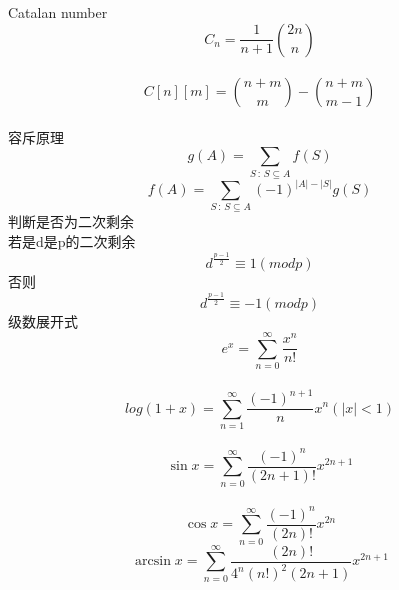 Catalan number\\
\[C_n = \frac{1}{n+1}{2n \choose n} \] \\
\[C[n][m] = {n+m \choose m} - {n+m \choose m-1} \]\\
容斥原理\\
\[g(A)=\sum_{S\,:\,S\subseteq A}f(S)\]
\[f(A)=\sum_{S\,:\,S\subseteq A}(-1)^{\left|A\right|-\left|S\right|}g(S)\]
判断是否为二次剩余\\
若是d是p的二次剩余
	\[ d^{\frac{p-1}{2}} \equiv 1 (mod p) \]
否则 \[ d^{\frac{p-1}{2}} \equiv -1 (mod p) \]
级数展开式
	\[ e^x = \sum\limits_{n=0}^{\infty} \frac{x^n}{n!} \] \\
	\[ log(1+x) = \sum\limits_{n=1}^{\infty} \frac{(-1)^{n+1}}{n}x^n (|x| < 1) \] \\
	\[ \sin x = \sum\limits_{n=0}^{\infty} \frac{(-1)^n}{(2n+1)!}x^{2n+1} \] \\
	\[ \cos x = \sum\limits_{n=0}^{\infty} \frac{(-1)^n}{(2n)!}x^{2n} \]
	\[ \arcsin x = \sum\limits_{n=0}^{\infty} \frac{(2n)!}{4^n(n!)^2(2n+1)} x^{2n+1} \] \\
